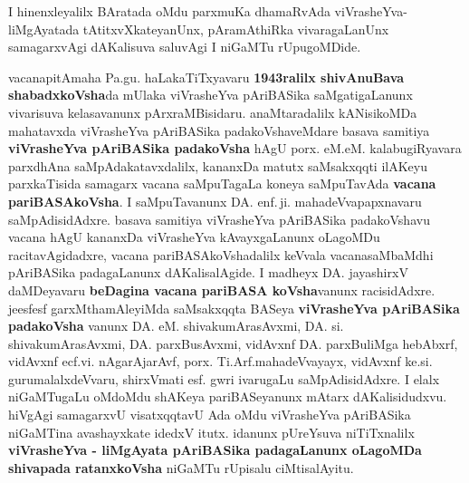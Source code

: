 \medskip

I hinenxleyalilx BAratada oMdu parxmuKa dhamaRvAda viVrasheYva-liMgAyatada tAtitxvXkateyanUnx, pAramAthiRka vivara\-gaLanUnx samagarxvAgi dAKalisuva saluvAgi I niGaMTu rUpugoMDide. 

\medskip

vacanapitAmaha Pa.gu. haLakaTiTxyavaru \textbf{1943ralilx shivAnuBava shabadxkoVsha}da mUlaka viVrasheYva pAriBASika saMgati\-gaLanunx vivarisuva kelasavanunx pArxraMBisidaru. anaMtaradalilx kANisikoMDa mahatavxda viVrasheYva pAriBASika padakoVsha\-veMdare basava samitiya \textbf{viVrasheYva pAriBASika padakoVsha} hAgU porx. eM.eM. kalabugiRyavara parxdhAna saMpAdakatavx\-dalilx, kananxDa matutx saMsakxqqti ilAKeyu parxkaTisida samagarx vacana saMpuTagaLa koneya saMpuTavAda \textbf{vacana pariBASA\-koVsha}. I saMpuTa\-vanunx DA. enf.\,ji. mahadeVvapapxnavaru saMpAdisidAdxre. basava samitiya viVrasheYva pAriBASika padakoVshavu vacana hAgU kananxDa \hbox{viVrasheYva} kAvayxgaLanunx oLagoMDu racitavAgidadxre, vacana pariBASAkoVshadalilx keVvala vacanasaMbaMdhi pAri\-BASika padagaLanunx dAKalisalAgide. I madheyx DA. jayashirxV daMDeyavaru \textbf{beDagina vacana pariBASA koVsha}vanunx racisidAdxre. jeesfesf garxMthamAleyiMda saMsakxqqta BASeya \textbf{viVrasheYva pAriBASika padakoVsha} vanunx DA. eM. shivakumAra\-sAvxmi, DA. si. shivakumAra\-sAvxmi, DA. parxBusAvxmi, vidAvxnf DA. parxBuliMga hebAbxrf, vidAvxnf ecf.vi. nAgarAjarAvf, porx. Ti.Arf.\break mahadeVvayayx, vidAvxnf ke.si. gurumalalxdeVvaru, shirxVmati esf. gwri ivarugaLu saMpAdi\-sidAdxre. I elalx niGaMTugaLu oMdoMdu shAKeya pariBASeyanunx mAtarx dAKalisidudxvu. hiVgAgi samagarxvU visatxqqtavU Ada oMdu viVrasheYva pAriBASika niGaMTina avashayxkate idedxV itutx. idanunx pUreYsuva niTiTxnalilx \textbf{viVrasheYva - liMgAyata pAriBASika padagaLanunx oLagoMDa shivapada ratanxkoVsha} niGaMTu rUpisalu ciMtisalAyitu.

\medskip

